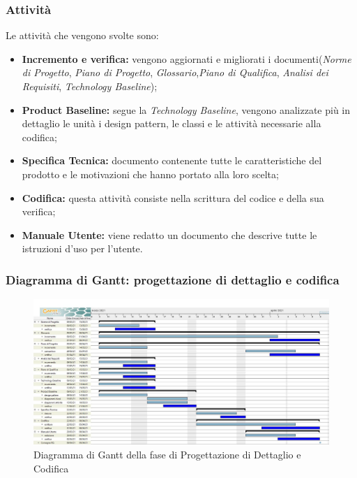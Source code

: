 \subsubsection{Attività}
Le attività che vengono svolte sono:
\begin{itemize}
	\item \textbf{Incremento e verifica:} vengono aggiornati e migliorati i documenti(\textit{Norme di Progetto}, \textit{Piano di Progetto}, \textit{Glossario},\textit{Piano di Qualifica}, \textit{Analisi dei Requisiti}, \textit{Technology Baseline});
	\item \textbf{Product Baseline:} segue la \textit{Technology Baseline}, vengono analizzate più in dettaglio le unità i design pattern, le classi e le attività necessarie alla codifica;
	\item \textbf{Specifica Tecnica:} documento contenente tutte le caratteristiche del prodotto e le motivazioni che hanno portato alla loro scelta;
	\item \textbf{Codifica:} questa attività consiste nella scrittura del codice e della sua verifica;
	\item \textbf{Manuale Utente:} viene redatto un documento che descrive tutte le istruzioni d'uso per l'utente.
\end{itemize}
\subsubsection{Diagramma di Gantt: progettazione di dettaglio e codifica}
\begin{figure}[H]
    \centering
    \includegraphics[scale = 0.25]{components/img/progettazione_dettaglio_codifica.jpg}
    \caption{Diagramma di Gantt della fase di Progettazione di Dettaglio e Codifica}
    \label{fig:Diagramma di Gantt, fase di Progettazione di dettaglio e codifica}
\end{figure}

